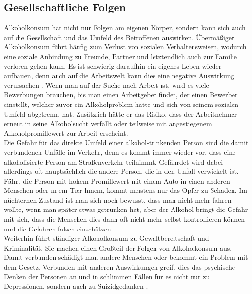 \documentclass[12pt]{article}
\begin{document}
\subsection{Gesellschaftliche Folgen}                                                                                                                
Alkoholkonsum hat nicht nur Folgen am eigenen Körper, sondern kann sich auch auf die Gesellschaft und das Umfeld des Betroffenen auswirken. Übermäßiger Alkoholkonsum führt häufig zum Verlust von sozialen Verhaltensweisen, wodurch eine soziale Anbindung zu Freunde, Partner und letztendlich auch zur Familie verloren gehen kann. Es ist schwierig daraufhin ein eigenes Leben wieder aufbauen, denn auch auf die Arbeitswelt kann dies eine negative Auswirkung verursachen \autocite{burger_bundes-gesundheitssurvey_2003}. Wenn man auf der Suche nach Arbeit ist, wird es viele Bewerbungen brauchen, bis man einen Arbeitgeber findet, der einen Bewerber einstellt, welcher zuvor ein Alkoholproblem hatte und sich von seinem sozialen Umfeld abgetrennt hat. Zusätzlich hätte er das Risiko, dass der Arbeitnehmer erneut in seine Alkoholsucht verfällt oder teilweise mit angestiegenem Alkoholpromillewert zur Arbeit erscheint. \\
Die Gefahr für das direkte Umfeld einer alkohol-trinkenden Person sind die damit verbundenen Unfälle im Verkehr, denn es kommt immer wieder vor, dass eine alkoholisierte Person am Straßenverkehr teilnimmt. Gefährdet wird dabei allerdings oft hauptsächlich die andere Person, die in den Unfall verwickelt ist. Fährt die Person mit hohem Promillewert mit einem Auto in einen anderen Menschen oder in ein Tier hinein, kommt meistens nur das Opfer zu Schaden. Im nüchternen Zustand ist man sich noch bewusst, dass man nicht mehr fahren wollte, wenn man später etwas getrunken hat, aber der Alkohol bringt die Gefahr mit sich, dass die Menschen dies dann oft nicht mehr selbst kontrollieren können und die Gefahren falsch einschätzen \autocite{burger_bundes-gesundheitssurvey_2003}. \\
Weiterhin führt ständiger Alkoholkonsum zu Gewaltbereitschaft und Kriminalität. Sie machen einen Großteil der Folgen von Alkoholkonsum aus. Damit verbunden schädigt man andere Menschen oder bekommt ein Problem mit dem Gesetz. Verbunden mit anderen Auswirkungen greift dies das psychische Denken der Personen an und in schlimmen Fällen für es nicht nur zu Depressionen, sondern auch zu Suizidgedanken \autocite{burger_bundes-gesundheitssurvey_2003}. \\
\end{document}
